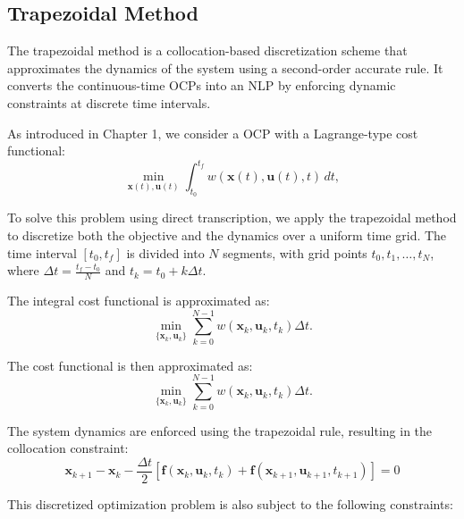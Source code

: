 \subsection{Trapezoidal Method}

The trapezoidal method is a collocation-based discretization scheme that approximates the dynamics of the system using a second-order accurate rule. It converts the continuous-time OCPs into an NLP by enforcing dynamic constraints at discrete time intervals.



As introduced in Chapter 1, we consider a OCP with a Lagrange-type cost functional:
\begin{equation}
\min_{\mathbf{x}(t), \mathbf{u}(t)} \int_{t_0}^{t_f} w(\mathbf{x}(t), \mathbf{u}(t), t) \, dt,
\tag*{\hfill Continuous Cost Functional}
\label{eq:continuous_cost}
\end{equation}

To solve this problem using direct transcription, we apply the trapezoidal method to discretize both the objective and the dynamics over a uniform time grid. The time interval \( [t_0, t_f] \) is divided into \( N \) segments, with grid points \( t_0, t_1, \ldots, t_N \), where \( \Delta t = \frac{t_f - t_0}{N} \) and \( t_k = t_0 + k \Delta t \).

The integral cost functional is approximated as:
\begin{equation}
\min_{\{\mathbf{x}_k, \mathbf{u}_k\}} \sum_{k=0}^{N-1} w(\mathbf{x}_k, \mathbf{u}_k, t_k) \Delta t.
\tag*{\hfill Discrete Cost Functional}
\label{eq:discrete_cost}
\end{equation}


The cost functional is then approximated as:
\begin{equation}
\min_{\{\mathbf{x}_k, \mathbf{u}_k\}} \sum_{k=0}^{N-1} w(\mathbf{x}_k, \mathbf{u}_k, t_k) \Delta t.
\tag*{\hfill Discrete Cost Functional}
\label{eq:discrete_cost}
\end{equation}

The system dynamics are enforced using the trapezoidal rule, resulting in the collocation constraint:
\begin{equation}
\mathbf{x}_{k+1} - \mathbf{x}_k - \frac{\Delta t}{2} \left[ \mathbf{f}(\mathbf{x}_k, \mathbf{u}_k, t_k) + \mathbf{f}(\mathbf{x}_{k+1}, \mathbf{u}_{k+1}, t_{k+1}) \right] = 0
\tag*{\hfill Collocation Constraint}
\label{eq:dyn_constraint}
\end{equation}

This discretized optimization problem is also subject to the following constraints:

